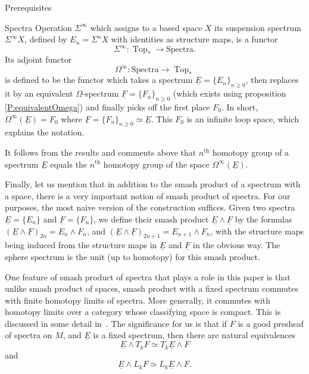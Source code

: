 \documentclass[12pt]{amsart}
\newcommand{\Top}{\operatorname{Top}}
\theoremstyle{plain}
\theoremstyle{definition}
\theoremstyle{remark}
\begin{document}
\begin{section}{Prerequisites}
\begin{subsection}{Spectra}
Operation $\Sigma^{\infty}$ which assigns to a based space $X$ its suspension spectrum $\Sigma^{\infty}X$, defined by $E_n=\Sigma^n X$ with identities as structure maps, is a functor $$\Sigma^{\infty}: \Top_* \to \text{Spectra}.$$
Its adjoint functor $$\Omega^{\infty}: \text{Spectra} \to \Top_*$$
is defined to be the functor which takes a spectrum $\underline{E}=\{E_n\}_{n \geq 0}$, then replaces it by an equivalent $\Omega$-spectrum $\underline{F}=\{F_n\}_{n \geq 0}$ (which exists using proposition \ref{P:equivalentOmega}) and finally picks off the first place $F_0$. In short, $\Omega^{\infty}(\underline{E})=F_0$ where $\underline{F}=\{F_n\}_{n \geq 0} \simeq \underline{E}$. This $F_0$ is an infinite loop space, which explains the notation.

It follows from the results and comments above that $n^{\text{th}}$ homotopy group of a spectrum $\underline{E}$ equals the $n^{\text{th}}$ homotopy group of the space $\Omega^{\infty}(\underline{E})$.

Finally, let us mention that in addition to the smash product of a spectrum with a space, there is a very important notion of smash product of spectra. For our purposes, the most naive version of the construction suffices. Given two spectra $\underline{E}=\{E_n\}$ and $\underline{F}=\{F_n\}$, we define their smash product $\underline{E}\wedge \underline{F}$ by the formulas $(\underline{E}\wedge \underline{F})_{2n}=E_n\wedge F_n$, and $(\underline{E}\wedge \underline{F})_{2n+1}=E_{n+1}\wedge F_n$, with the structure maps being induced from the structure maps in $\underline{E}$ and $\underline{F}$ in the obvious way. The sphere spectrum is the unit (up to homotopy) for this smash product. 

One feature of smash product of spectra that plays a role in this paper is that unlike smash product of spaces, smash product with a fixed spectrum commutes with finite homotopy limits of spectra. More generally, it commutes with homotopy limits over a category whose classifying space is compact. This is discussed in some detail in~\cite{LRV:HolimsSmash}. The significance for us is that if $F$ is a good presheaf of spectra on $M$, and $\underline{E}$ is a fixed spectrum, then there are natural equivalences %
\[
\underline{E}\wedge T_kF\simeq T_k\underline{E}\wedge F
\]
and
\[
\underline{E} \wedge L_kF \simeq L_k \underline{E} \wedge F.
\] 
\end{subsection}
\end{section}
\end{document}
